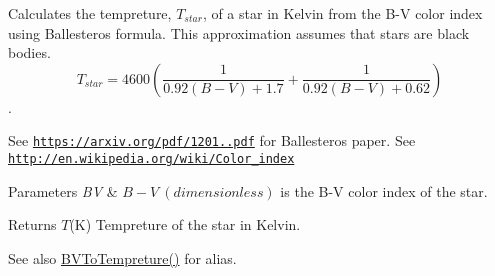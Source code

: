 Calculates the tempreture, $T_{star}$, of a star in Kelvin from the B-\/V color index using Ballesteros\textquotesingle{} formula. This approximation assumes that stars are black bodies. \[T_{star}=4600 \left ( \frac{1}{0.92 (B-V)+ 1.7} + \frac{1}{0.92 (B-V) + 0.62} \right )\]. 

See \href{https://arxiv.org/pdf/1201.1809.pdf}{\tt https\+://arxiv.\+org/pdf/1201..\+pdf} for Ballesteros\textquotesingle{} paper. See \href{http://en.wikipedia.org/wiki/Color_index}{\tt http\+://en.\+wikipedia.\+org/wiki/\+Color\+\_\+index}


\begin{DoxyParams}{Parameters}
{\em BV} & $B-V\ (dimensionless)$ is the B-\/V color index of the star. \\
\hline
\end{DoxyParams}
\begin{DoxyReturn}{Returns}
$T$(K) Tempreture of the star in Kelvin. 
\end{DoxyReturn}
\begin{DoxySeeAlso}{See also}
\mbox{\hyperlink{group___e_g_x_phys-_b_v_color_ga11cf848625fe052fe9250ce2aa22253b}{B\+V\+To\+Tempreture()}} for alias. 
\end{DoxySeeAlso}
